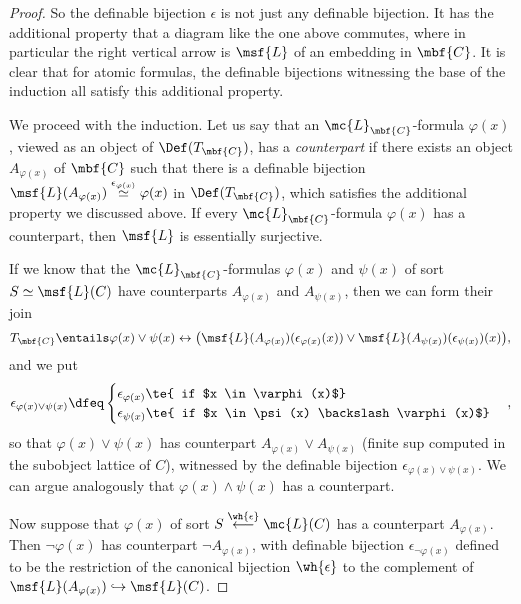 \documentclass[11pt]{article}
\begin{document}
\begin{proof}
So the definable bijection $\epsilon$ is not just any definable bijection. It has the additional property that a diagram like the one above commutes, where in particular the right vertical arrow is $\msf{L}$ of an embedding in $\mbf{C}$. It is clear that for atomic formulas, the definable bijections witnessing the base of the induction all satisfy this additional property.

We proceed with the induction. Let us say that an $\mc{L}_{\mbf{C}}$-formula $\varphi(x)$, viewed as an object of $\Def(T_{\mbf{C}})$, has a \emph{counterpart} if there exists an object $A_{\varphi(x)}$ of $\mbf{C}$ such that there is a definable bijection $\msf{L}(A_{\varphi(x)}) \overset{\epsilon_{\varphi(x)}}{\simeq} \varphi(x)$ in $\Def(T_{\mbf{C}})$, which satisfies the additional property we discussed above. If every $\mc{L}_{\mbf{C}}$-formula $\varphi(x)$ has a counterpart, then $\msf{L}$ is essentially surjective.

If we know that the $\mc{L}_{\mbf{C}}$-formulas $\varphi(x)$ and $\psi(x)$ of sort $S \simeq \msf{L}(C)$ have counterparts $A_{\varphi(x)}$ and $A_{\psi(x)}$, then we can form their join
$$T_{\mbf{C}} \entails \varphi(x) \lor \psi(x) \leftrightarrow \bigl(\msf{L}(A_{\varphi(x)})(\epsilon_{\varphi(x)}(x)) \lor \msf{L}(A_{\psi(x)})(\epsilon_{\psi(x)})(x)\bigr),$$
and we put $$\epsilon_{\varphi(x) \lor \psi(x)} \dfeq \begin{cases} \epsilon_{\varphi(x)} \te{ if $x \in \varphi(x)$}\\
  \epsilon_{\psi(x)} \te{ if $x \in \psi(x) \backslash \varphi(x)$}
  \end{cases},$$
  so that $\varphi(x) \lor \psi(x)$ has counterpart $A_{\varphi(x)} \lor A_{\psi(x)}$ (finite sup computed in the subobject lattice of $C$), witnessed by the definable bijection $\epsilon_{\varphi(x) \lor \psi(x)}$. We can argue analogously that $\varphi(x) \land \psi(x)$ has a counterpart.

  Now suppose that $\varphi(x)$ of sort $S \overset{\wh{\epsilon}}{\longleftarrow} \mc{L}(C)$ has a counterpart $A_{\varphi(x)}$. Then $\neg \varphi(x)$ has counterpart $\neg A_{\varphi(x)}$, with definable bijection $\epsilon_{\neg \varphi(x)}$ defined to be the restriction of the canonical bijection $\wh{\epsilon}$ to the complement of $\msf{L}(A_{\varphi(x)}) \hookrightarrow \msf{L}(C)$.


\end{proof}
\end{document}
